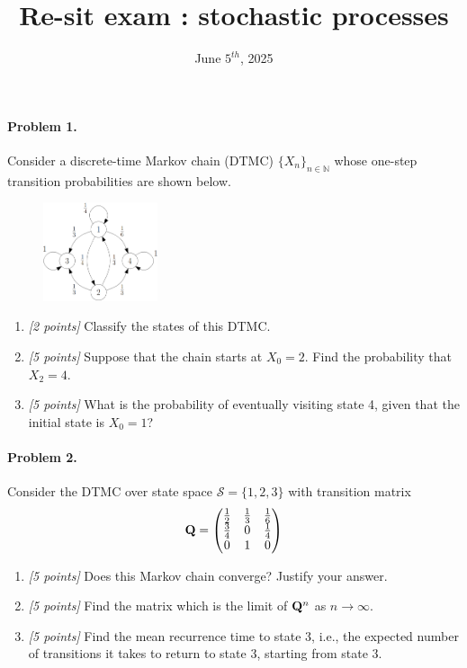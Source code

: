 \documentclass[article,12pt,a4paper]{article}
\title{ \bfseries \Huge {Re-sit exam : stochastic processes}}
\date{June $5^{th}$, 2025}
\newcommand{\N}{\mathbb N}
\newcommand{\calS}{\mathcal S}
\newcommand{\bQ}{\bold Q}
\begin{document}
	
	\paragraph{Problem 1.}
	
	Consider a discrete-time Markov chain (DTMC) $\{X_n\}_{n\in\N}$ whose one-step transition probabilities are shown below.
		\begin{figure}[h]
		\centering
		\includegraphics[width=0.3\textwidth]{markov_1.png} 
	\end{figure}
	\begin{enumerate}
		\item\textit{[2 points]}  Classify the states of this DTMC.
		\item\textit{[5 points]}  Suppose that the chain starts at $X_0 = 2$. Find the probability that $X_2 = 4$.
		\item\textit{[5 points]} What is the probability of eventually visiting state 4, given that the initial state is $X_0 = 1$?
		
	\end{enumerate}
	\medskip
	
		\paragraph{Problem 2.}
	Consider the DTMC over state space $\calS = \{1,2,3\}$ with transition matrix
	\[
	\bQ = \begin{pmatrix}
		\frac{1}{2} & \frac{1}{3} & \frac{1}{6} \\
		\frac{3}{4} & 0 & \frac{1}{4} \\
		0 & 1 & 0
	\end{pmatrix}
	\]
	
	\begin{enumerate}
		\item \textit{[5 points]} Does this Markov chain converge? Justify your answer.
		
		\item \textit{[5 points]} Find the matrix which is the limit of $\bQ^n$ as $n \to \infty$.
		
		\item \textit{[5 points]} Find the mean recurrence time to state 3, i.e., the expected number of transitions it takes to return to state 3, starting from state 3.
	\end{enumerate}
	
\end{document}
